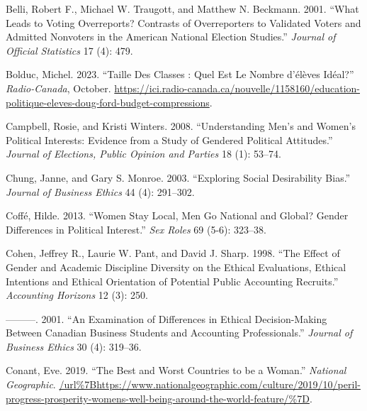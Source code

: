 \documentclass[
  letterpaper,
  DIV=11,
  numbers=noendperiod]{scrreprt}
\newlength{\cslhangindent}
\newlength{\cslentryspacingunit} %
\newenvironment{CSLReferences}[2] %
 {%
  \setlength{\parindent}{0pt}
  \ifodd #1
  \let\oldpar\par
  \def\par{\hangindent=\cslhangindent\oldpar}
  \fi
  \setlength{\parskip}{#2\cslentryspacingunit}
 }%
 {}
\begin{document}
\hypertarget{refs-2}{}
\begin{CSLReferences}{1}{0}
\leavevmode{}%
Belli, Robert F., Michael W. Traugott, and Matthew N. Beckmann. 2001.
{``{What Leads to Voting Overreports? Contrasts of Overreporters to
Validated Voters and Admitted Nonvoters in the American National
Election Studies}.''} \emph{Journal of Official Statistics} 17 (4): 479.

\leavevmode{}%
Bolduc, Michel. 2023. {``Taille Des Classes : Quel Est Le Nombre
d'élèves Idéal?''} \emph{Radio-Canada}, October.
\url{https://ici.radio-canada.ca/nouvelle/1158160/education-politique-eleves-doug-ford-budget-compressions}.

\leavevmode{}%
Campbell, Rosie, and Kristi Winters. 2008. {``{Understanding Men's and
Women's Political Interests: Evidence from a Study of Gendered Political
Attitudes}.''} \emph{Journal of Elections, Public Opinion and Parties}
18 (1): 53--74.

\leavevmode{}%
Chung, Janne, and Gary S. Monroe. 2003. {``{Exploring Social
Desirability Bias}.''} \emph{Journal of Business Ethics} 44 (4):
291--302.

\leavevmode{}%
Coffé, Hilde. 2013. {``{Women Stay Local, Men Go National and Global?
Gender Differences in Political Interest}.''} \emph{Sex Roles} 69 (5-6):
323--38.

\leavevmode{}%
Cohen, Jeffrey R., Laurie W. Pant, and David J. Sharp. 1998. {``{The
Effect of Gender and Academic Discipline Diversity on the Ethical
Evaluations, Ethical Intentions and Ethical Orientation of Potential
Public Accounting Recruits}.''} \emph{Accounting Horizons} 12 (3): 250.

\leavevmode{}%
---------. 2001. {``{An Examination of Differences in Ethical
Decision-Making Between Canadian Business Students and Accounting
Professionals}.''} \emph{Journal of Business Ethics} 30 (4): 319--36.

\leavevmode{}%
Conant, Eve. 2019. {``{The Best and Worst Countries to be a Woman}.''}
\emph{National Geographic}.
\url{/url\%7Bhttps://www.nationalgeographic.com/culture/2019/10/peril-progress-prosperity-womens-well-being-around-the-world-feature/\%7D}.


\end{CSLReferences}
\end{document}
